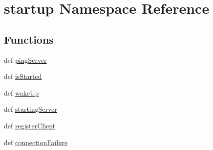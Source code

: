 \hypertarget{namespacestartup}{
\section{startup Namespace Reference}
\label{namespacestartup}
}
\subsection*{Functions}
\begin{DoxyCompactItemize}
\item 
def \hyperlink{namespacestartup_a80f9fff1cbef1c5f4865ff1c280bcf46}{pingServer}
\item 
def \hyperlink{namespacestartup_a3e8d5118385e6ea9e46290ebbea3c0bf}{isStarted}
\item 
def \hyperlink{namespacestartup_a8490cf3b4776fae773695885b458735d}{wakeUp}
\item 
def \hyperlink{namespacestartup_a54470559cec905fb6c3e7a28948ed630}{startingServer}
\item 
def \hyperlink{namespacestartup_a0ae5f610c07b31b70ef083be751c9b14}{registerClient}
\item 
def \hyperlink{namespacestartup_a47fce4fb0a6699061683fa2bffb62f30}{connectionFailure}
\end{DoxyCompactItemize}
